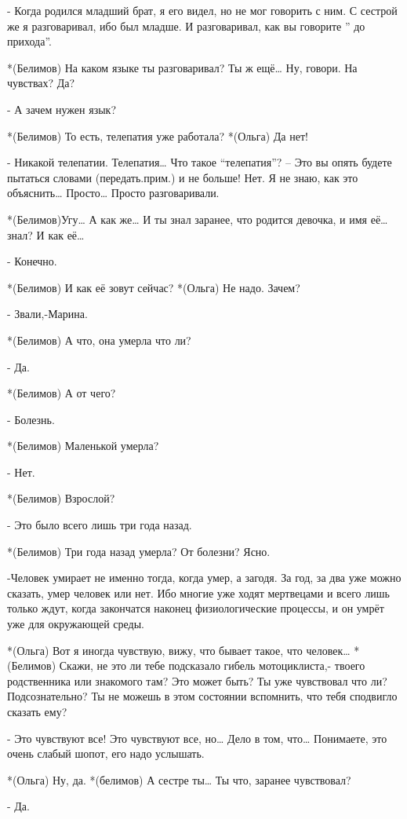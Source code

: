 - Когда родился младший брат, я его видел, но не мог говорить с ним. С сестрой же я разговаривал, ибо был младше. И разговаривал, как вы говорите ” до прихода”.

*(Белимов) На каком языке ты разговаривал? Ты ж ещё… Ну, говори. На чувствах? Да?

- А зачем нужен язык?

*(Белимов) То есть, телепатия уже работала?
*(Ольга) Да нет!

- Никакой телепатии. Телепатия… Что такое “телепатия”? – Это вы опять будете пытаться словами (передать.прим.) и не больше! Нет. Я не знаю, как это объяснить… Просто… Просто разговаривали.

*(Белимов)Угу… А как же… И ты знал заранее, что родится девочка, и имя её…знал? И как её…

- Конечно.

*(Белимов) И как её зовут сейчас?
*(Ольга) Не надо. Зачем?

- Звали,-Марина.	

*(Белимов) А что, она умерла что ли?

- Да.

*(Белимов) А от чего?

- Болезнь.

*(Белимов) Маленькой умерла?

- Нет.

*(Белимов) Взрослой?

- Это было всего лишь три года назад.

*(Белимов) Три года назад умерла? От болезни? Ясно.

-Человек умирает не именно тогда, когда умер, а загодя. За год, за два уже можно сказать, умер человек или нет. Ибо многие уже ходят мертвецами и всего лишь только ждут, когда закончатся наконец физиологические процессы, и он умрёт уже для окружающей среды.

*(Ольга) Вот я  иногда чувствую, вижу, что бывает такое, что человек…
*(Белимов) Скажи, не это ли тебе подсказало гибель мотоциклиста,- твоего родственника или знакомого там? Это может быть? Ты уже чувствовал что ли? Подсознательно? Ты не можешь в этом состоянии вспомнить, что тебя сподвигло сказать ему?

- Это чувствуют все! Это чувствуют все, но… Дело в том, что… Понимаете, это очень слабый шопот, его надо услышать.


*(Ольга) Ну, да.
*(белимов) А сестре ты… Ты что, заранее чувствовал?

- Да.


